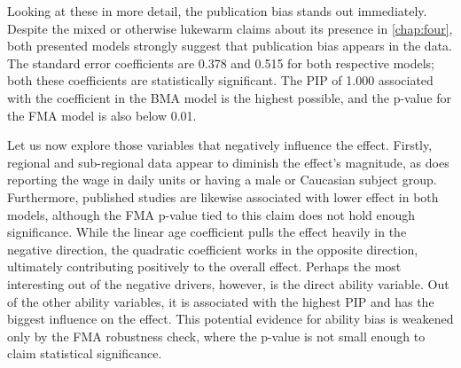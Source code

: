 {\begin{singlespace}
\begin{notsotiny}
\end{notsotiny}
\end{singlespace}
\clearpage
}

Looking at these in more detail, the publication bias stands out immediately. Despite the mixed or otherwise lukewarm claims about its presence in \autoref{chap:four}, both presented models strongly suggest that publication bias appears in the data. The standard error coefficients are 0.378 and 0.515 for both respective models; both these coefficients are statistically significant. The \ac{PIP} of 1.000 associated with the coefficient in the \ac{BMA} model is the highest possible, and the p-value for the \ac{FMA} model is also below 0.01.

Let us now explore those variables that negatively influence the effect. Firstly, regional and sub-regional data appear to diminish the effect's magnitude, as does reporting the wage in daily units or having a male or Caucasian subject group. Furthermore, published studies are likewise associated with lower effect in both models, although the \ac{FMA} p-value tied to this claim does not hold enough significance. While the linear age coefficient pulls the effect heavily in the negative direction, the quadratic coefficient works in the opposite direction, ultimately contributing positively to the overall effect. Perhaps the most interesting out of the negative drivers, however, is the direct ability variable. Out of the other ability variables, it is associated with the highest \ac{PIP} and has the biggest influence on the effect. This potential evidence for ability bias is weakened only by the \ac{FMA} robustness check, where the p-value is not small enough to claim statistical significance.


